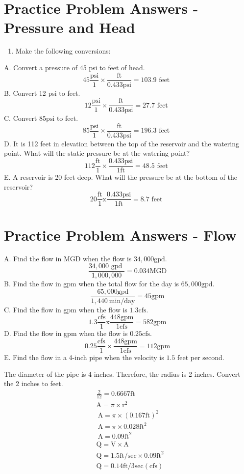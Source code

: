 \section{Practice Problem Answers - Pressure and Head}
\begin{enumerate}
  \item Make the following conversions:
\end{enumerate}
A. Convert a pressure of 45 psi to feet of head.
$$
45 \frac{\mathrm{psi}}{1} \times \frac{\mathrm{ft}}{0.433 \mathrm{psi}}=103.9 \text { feet }
$$
B. Convert 12 psi to feet.
$$
12 \frac{\mathrm{psi}}{1} \times \frac{\mathrm{ft}}{0.433 \mathrm{psi}}=27.7 \text { feet }
$$
C. Convert $85 \mathrm{psi}$ to feet.
$$
85 \frac{\mathrm{psi}}{1} \times \frac{\mathrm{ft}}{0.433 \mathrm{psi}}=196.3 \text { feet }
$$
D. It is 112 feet in elevation between the top of the reservoir and the watering point. What will the static pressure be at the watering point?
$$
112 \frac{\mathrm{ft}}{1} \times \frac{0.433 \mathrm{psi}}{1 \mathrm{ft}}=48.5 \text { feet }
$$
E. A reservoir is 20 feet deep. What will the pressure be at the bottom of the reservoir?
$$
20 \frac{\mathrm{ft}}{1} \mathrm{x} \frac{0.433 \mathrm{psi}}{1 \mathrm{ft}}=8.7 \text { feet }
$$

\section{Practice Problem Answers - Flow}
A. Find the flow in MGD when the flow is $34,000 \mathrm{gpd}$.
$$
\frac{34,000 \text { gpd }}{1,000,000}=0.034 \mathrm{MGD}
$$
B. Find the flow in gpm when the total flow for the day is $65,000 \mathrm{gpd}$.
$$
\frac{65,000 \mathrm{gpd}}{1,440 \mathrm{~min} / \mathrm{day}}=45 \mathrm{gpm}
$$
C. Find the flow in gpm when the flow is $1.3 \mathrm{cfs}$.
$$
1.3 \frac{\mathrm{cfs}}{1} \mathrm{x} \frac{448 \mathrm{gpm}}{1 \mathrm{cfs}}=582 \mathrm{gpm}
$$
D. Find the flow in gpm when the flow is $0.25 \mathrm{cfs}$.
$$
0.25 \frac{\mathrm{cfs}}{1} \times \frac{448 \mathrm{gpm}}{1 \mathrm{cfs}}=112 \mathrm{gpm}
$$
E. Find the flow in a 4-inch pipe when the velocity is $1.5$ feet per second.

The diameter of the pipe is 4 inches. Therefore, the radius is 2 inches. Convert the 2 inches to feet.
$$
\begin{aligned}
&\frac{2}{12}=0.6667 \mathrm{ft} \\
&\mathrm{A}=\pi \times \mathrm{r}^{2} \\
&\mathrm{~A}=\pi \times(0.167 \mathrm{ft})^{2} \\
&\mathrm{~A}=\pi \times 0.028 \mathrm{ft}^{2} \\
&\mathrm{~A}=0.09 \mathrm{ft}^{2} \\
&\mathrm{Q}=\mathrm{V} \times \mathrm{A} \\
&\mathrm{Q}=1.5 \mathrm{ft} / \mathrm{sec} \times 0.09 \mathrm{ft}^{2} \\
&\mathrm{Q}=0.14 \mathrm{ft} / 3 \mathrm{sec}(\mathrm{cfs})
\end{aligned}
$$

